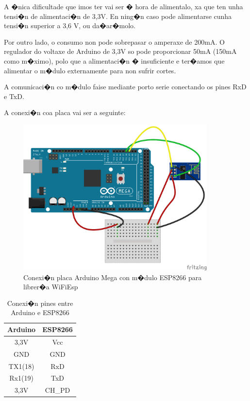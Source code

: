 \documentclass[11pt,twoside]{book}
\begin{document}
A �nica dificultade que imos ter vai ser � hora de alimentalo, xa que ten unha tensi�n de alimentaci�n de 3,3V. En ning�n caso pode alimentarse cunha tensi�n superior a 3,6 V, ou da�ar�molo.

Por outro lado, o consumo non pode sobrepasar o amperaxe de 200mA. O regulador do voltaxe de Arduino de 3,3V so pode proporcionar 50mA (150mA como m�ximo), polo que a alimentaci�n � insuficiente e ter�amos que alimentar o m�dulo externamente para non sufrir cortes.

A comunicaci�n co m�dulo faise mediante porto serie conectando os pines RxD e TxD.

A conexi�n coa placa vai ser a seguinte:

\begin{figure}[H]
	\begin{center}
		\includegraphics[width=10cm]{images/conexionArduinoESP8266_WiFiEsp.png}
	\end{center}
	\caption{Conexi�n placa Arduino Mega con m�dulo ESP8266 para librer�a WiFiEsp}
	\label{fig:ConexionESP8266}
\end{figure}

\begin{table}[htbt]
\begin{center}
\begin{tabular}{|c|c|}
\hline
Arduino & ESP8266 \\
\hline
3,3V & Vcc \\
\hline
GND & GND \\
\hline
TX1(18) & RxD \\
\hline
Rx1(19) & TxD \\
\hline
3,3V & CH\_PD \\
\hline
\end{tabular}
\caption{Conexi�n pines entre Arduino e ESP8266}
\label{TablaArduinoESP8266_WiFiEsp}
\end{center}
\end{table}
\end{document}
